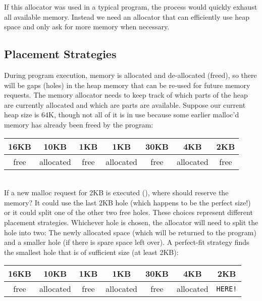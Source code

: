 If this allocator was used in a typical program, the process would quickly exhaust all available memory. Instead we need an allocator that can efficiently use heap space and only ask for more memory when necessary.

\subsection{Placement Strategies}

During program execution, memory is allocated and de-allocated (freed), so there will be gaps (holes) in the heap memory that can be re-used for future memory requests. The memory allocator needs to keep track of which parts of the heap are currently allocated and which are parts are available. Suppose our current heap size is 64K, though not all of it is in use because some earlier malloc'd memory has already been freed by the program:
\\
\begin{center}
\begin{tabular}{ | c | c | c | c | c | c | c | }
\hline
16KB & 10KB & 1KB & 1KB & 30KB & 4KB & 2KB \\ \hline
free & allocated & free & allocated & free & allocated & free \\
\hline
\end{tabular}
\end{center}
\\
If a new malloc request for 2KB is executed (), where should  reserve the memory? It could use the last 2KB hole (which happens to be the perfect size!) or it could split one of the other two free holes. These choices represent different placement strategies. Whichever hole is chosen, the allocator will need to split the hole into two: The newly allocated space (which will be returned to the program) and a smaller hole (if there is spare space left over). A perfect-fit strategy finds the smallest hole that is of sufficient size (at least 2KB):
\\
\begin{center}
\begin{tabular}{ | c | c | c | c | c | c | c | }
\hline
16KB & 10KB & 1KB & 1KB & 30KB & 4KB & 2KB \\ \hline
free & allocated & free & allocated & free & allocated & \texttt{HERE!} \\
\hline
\end{tabular}
\end{center}
\\

